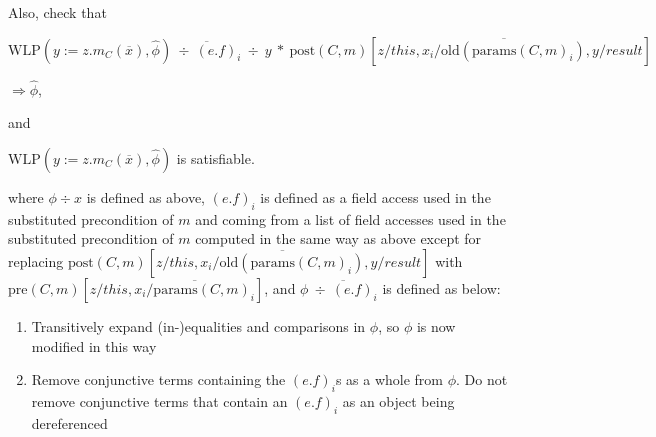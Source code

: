 \documentclass {article}
\newcommand{\fphi}{\widehat{\phi}}
\newcommand{\imp}{\Rightarrow}
\newcommand{\wlp}[2]{\text{WLP}(#1,#2)}
\begin{document}
Also, check that 

$\wlp{y := z.m_C(\overline{x})}{\fphi} \overline{\ \div \ (e.f)_i} \ \div \ y \ \ast \ \text{post}(C,m)\left[z/this, \overline{x_i/\text{old}(\text{params}(C,m)_i)}, y/result \right]$

\hspace{1cm} $\imp \fphi$,

and


$\wlp{y := z.m_C(\overline{x})}{\fphi}$ is satisfiable. 


where $\phi \div x$ is defined as above, $(e.f)_i$ is defined as a field access used in the substituted precondition of $m$ and coming from a list of field accesses used in the substituted precondition of $m$ computed in the same way as above except for replacing $\text{post}(C,m)\left[z/this, \overline{x_i/\text{old}(\text{params}(C,m)_i)}, y/result \right]$ with $\text{pre}(C,m)\left[z/this, \overline{x_i/\text{params}(C,m)_i}\right]$, and $\phi \overline{\ \div \ (e.f)_i}$ is defined as below:

\begin{enumerate}
\item Transitively expand (in-)equalities and comparisons in $\phi$, so $\phi$ is now modified in this way
\item Remove conjunctive terms containing the $(e.f)_i$s as a whole from $\phi$. Do not remove conjunctive terms that contain an $(e.f)_i$ as an object being dereferenced
\end{enumerate}

\end{document}
